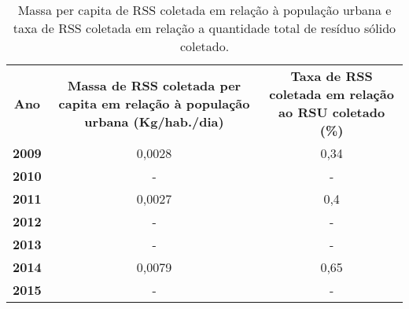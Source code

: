 \begin{table}[htbp]
  \centering
  \caption{Massa per capita de RSS coletada em relação à população urbana e taxa de RSS coletada em relação a quantidade total de resíduo sólido coletado.}
    \begin{tabular}{c|c|c}
    \rowcolor[rgb]{ .969,  .588,  .275} \textcolor[rgb]{ 1,  1,  1}{\textbf{Ano}} & \multicolumn{1}{p{10em}|}{\textcolor[rgb]{ 1,  1,  1}{\textbf{Massa de RSS coletada per capita em relação à população urbana (Kg/hab./dia)}}} & \multicolumn{1}{p{8.355em}}{\textcolor[rgb]{ 1,  1,  1}{\textbf{Taxa de RSS coletada em relação ao RSU coletado (\%)}}} \\
    \rowcolor[rgb]{ .984,  .831,  .706} \textbf{2009} & 0,0028 & 0,34 \\
    \rowcolor[rgb]{ .992,  .914,  .851} \textbf{2010} & -     & - \\
    \rowcolor[rgb]{ .984,  .831,  .706} \textbf{2011} & 0,0027 & 0,4 \\
    \rowcolor[rgb]{ .992,  .914,  .851} \textbf{2012} & -     & - \\
    \rowcolor[rgb]{ .984,  .831,  .706} \textbf{2013} & -     & - \\
    \rowcolor[rgb]{ .992,  .914,  .851} \textbf{2014} & 0,0079 & 0,65 \\
    \rowcolor[rgb]{ .984,  .831,  .706} \textbf{2015} & -     & - \\
    \end{tabular}%
  \label{tab:massa_rss}%
\end{table}%
